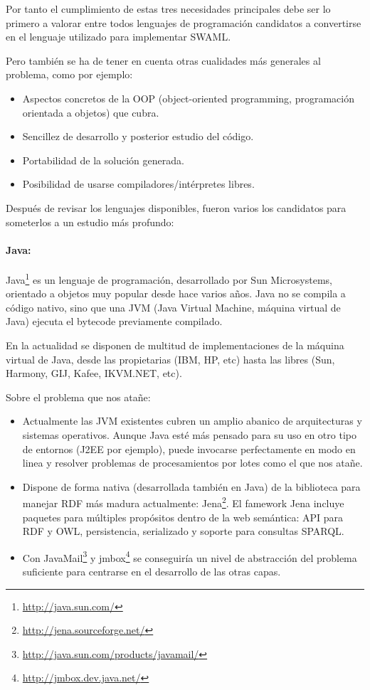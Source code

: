 Por tanto el cumplimiento de estas tres necesidades principales debe ser lo 
primero a valorar entre todos lenguajes de programación candidatos a convertirse 
en el lenguaje utilizado para implementar SWAML. 

Pero también se ha de tener en cuenta otras cualidades más generales al problema,
como por ejemplo:

\begin{itemize}
  \item Aspectos concretos de la OOP (object-oriented programming, programación 
	orientada a objetos) que cubra.
  \item Sencillez de desarrollo y posterior estudio del código.
  \item Portabilidad de la solución generada.
  \item Posibilidad de usarse compiladores/intérpretes libres.
\end{itemize}

Después de revisar los lenguajes disponibles, fueron varios los candidatos para
someterlos a un estudio más profundo:

\paragraph{Java:}Java\footnote{\url{http://java.sun.com/}} es un lenguaje de 
programación, desarrollado por Sun Microsystems, orientado a objetos muy popular 
desde hace varios años. Java no se compila a código nativo, sino que una JVM 
(Java Virtual Machine, máquina virtual de Java) ejecuta el bytecode previamente 
compilado.

En la actualidad se disponen de multitud de implementaciones de la máquina virtual
de Java, desde las propietarias (IBM, HP, etc) hasta las libres (Sun, Harmony, GIJ, 
Kafee, IKVM.NET, etc).

Sobre el problema que nos atañe:

\begin{itemize}
  \item Actualmente las JVM existentes cubren un amplio abanico de arquitecturas y 
	sistemas operativos. Aunque Java esté más pensado para su uso en otro tipo
	de entornos (J2EE por ejemplo), puede invocarse perfectamente en modo en
	linea y resolver problemas de procesamientos por lotes como el que nos
	atañe.
  \item Dispone de forma nativa (desarrollada también en Java) de la biblioteca para
	manejar RDF más madura actualmente: Jena\footnote{\url{http://jena.sourceforge.net/}}.
	El famework Jena incluye paquetes para múltiples propósitos dentro de la web
	semántica: API para RDF y OWL, persistencia, serializado y soporte para consultas
	SPARQL.
  \item Con JavaMail\footnote{\url{http://java.sun.com/products/javamail/}} y
	jmbox\footnote{\url{http://jmbox.dev.java.net/}} se conseguiría un nivel
	de abstracción del problema suficiente para centrarse en el desarrollo
	de las otras capas.
\end{itemize}

